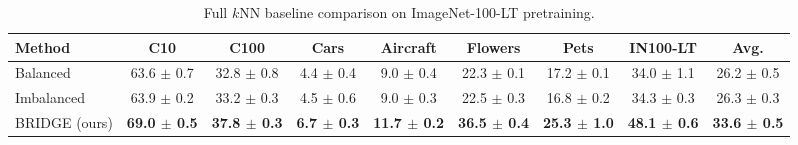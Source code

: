 \begin{table}[H]
\centering
\scriptsize
\setlength{\tabcolsep}{3.5pt}
\caption{Full $k$NN baseline comparison on ImageNet-100-LT pretraining.}
\label{tab:app_baselines_knn_full}
\begin{adjustbox}{width=\textwidth}
\begin{tabular}{l c c c c c c c c}
\toprule
Method & C10 & C100 & Cars & Aircraft & Flowers & Pets & IN100-LT & Avg. \\
\midrule
Balanced & 63.6 {\scriptsize$\pm$ 0.7} & 32.8 {\scriptsize$\pm$ 0.8} & 4.4 {\scriptsize$\pm$ 0.4} & 9.0 {\scriptsize$\pm$ 0.4} & 22.3 {\scriptsize$\pm$ 0.1} & 17.2 {\scriptsize$\pm$ 0.1} & 34.0 {\scriptsize$\pm$ 1.1} & 26.2 {\scriptsize$\pm$ 0.5} \\
Imbalanced & 63.9 {\scriptsize$\pm$ 0.2} & 33.2 {\scriptsize$\pm$ 0.3} & 4.5 {\scriptsize$\pm$ 0.6} & 9.0 {\scriptsize$\pm$ 0.3} & 22.5 {\scriptsize$\pm$ 0.3} & 16.8 {\scriptsize$\pm$ 0.2} & 34.3 {\scriptsize$\pm$ 0.3} & 26.3 {\scriptsize$\pm$ 0.3} \\
BRIDGE (ours) & \textbf{69.0 {\scriptsize$\pm$ 0.5}} & \textbf{37.8 {\scriptsize$\pm$ 0.3}} & \textbf{6.7 {\scriptsize$\pm$ 0.3}} & \textbf{11.7 {\scriptsize$\pm$ 0.2}} & \textbf{36.5 {\scriptsize$\pm$ 0.4}} & \textbf{25.3 {\scriptsize$\pm$ 1.0}} & \textbf{48.1 {\scriptsize$\pm$ 0.6}} & \textbf{33.6 {\scriptsize$\pm$ 0.5}} \\
\bottomrule
\end{tabular}
\end{adjustbox}
\end{table}
